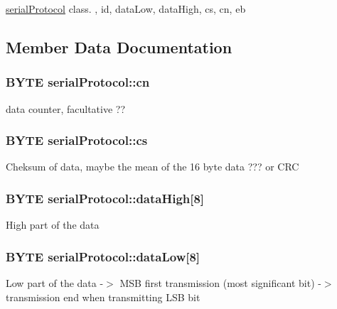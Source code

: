 \hyperlink{structserial_protocol}{serial\+Protocol} class. , id, data\+Low, data\+High, cs, cn, eb 

\subsection{Member Data Documentation}
\hypertarget{structserial_protocol_a75f22d859a2edf76df2fc96f8dd4b901}{}
\subsubsection[{cn}]{\setlength{\rightskip}{0pt plus 5cm}B\+Y\+T\+E serial\+Protocol\+::cn}\label{structserial_protocol_a75f22d859a2edf76df2fc96f8dd4b901}
data counter, facultative ?? \hypertarget{structserial_protocol_aeafe645e9ba8983649aac07b5c85f1a2}{}
\subsubsection[{cs}]{\setlength{\rightskip}{0pt plus 5cm}B\+Y\+T\+E serial\+Protocol\+::cs}\label{structserial_protocol_aeafe645e9ba8983649aac07b5c85f1a2}
Cheksum of data, maybe the mean of the 16 byte data ??? or C\+R\+C \hypertarget{structserial_protocol_a4f9b454d8730babf5397c1f1d582e727}{}
\subsubsection[{data\+High}]{\setlength{\rightskip}{0pt plus 5cm}B\+Y\+T\+E serial\+Protocol\+::data\+High\mbox{[}8\mbox{]}}\label{structserial_protocol_a4f9b454d8730babf5397c1f1d582e727}
High part of the data \hypertarget{structserial_protocol_a3e40b60e8c92091fb59e00ee05a07eb1}{}
\subsubsection[{data\+Low}]{\setlength{\rightskip}{0pt plus 5cm}B\+Y\+T\+E serial\+Protocol\+::data\+Low\mbox{[}8\mbox{]}}\label{structserial_protocol_a3e40b60e8c92091fb59e00ee05a07eb1}
Low part of the data -\/$>$ M\+S\+B first transmission (most significant bit) -\/$>$ transmission end when transmitting L\+S\+B bit \hypertarget{structserial_protocol_af8e01f5811bdc9a2906aceed9ae19f0f}{}
